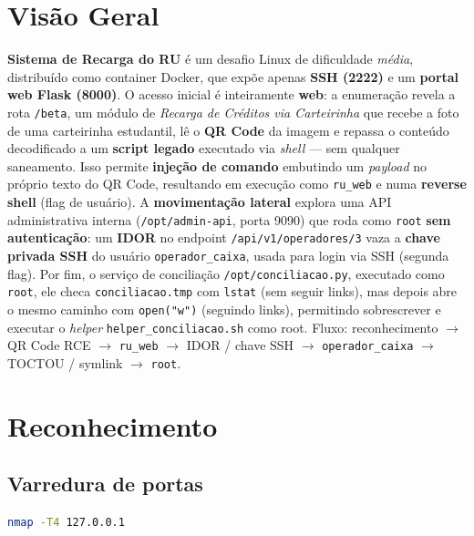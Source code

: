 \documentclass[12pt,a4paper]{article}
\begin{document}
\section{Visão Geral}
\textbf{Sistema de Recarga do RU} é um desafio Linux de dificuldade \emph{média},
distribuído como container Docker, que expõe apenas \textbf{SSH (2222)} e um
\textbf{portal web Flask (8000)}. O acesso inicial é inteiramente \textbf{web}: a
enumeração revela a rota \texttt{/beta}, um módulo de \emph{Recarga de Créditos via
Carteirinha} que recebe a foto de uma carteirinha estudantil, lê o \textbf{QR
Code} da imagem e repassa o conteúdo decodificado a um \textbf{script legado}
executado via \emph{shell} --- sem qualquer saneamento. Isso permite
\textbf{injeção de comando} embutindo um \emph{payload} no próprio
texto do QR Code, resultando em execução como \texttt{ru\_web} e numa
\textbf{reverse shell} (flag de usuário). A \textbf{movimentação lateral} explora
uma API administrativa interna (\texttt{/opt/admin-api}, porta 9090) que roda como
\texttt{root} \textbf{sem autenticação}: um \textbf{IDOR} no endpoint
\texttt{/api/v1/operadores/3} vaza a \textbf{chave privada SSH} do usuário
\texttt{operador\_caixa}, usada para login via SSH (segunda flag). Por fim, o
serviço de conciliação \texttt{/opt/conciliacao.py}, executado como \texttt{root}, ele
checa \texttt{conciliacao.tmp} com \texttt{lstat} (sem seguir links), mas depois
abre o mesmo caminho com \texttt{open("w")} (seguindo links), permitindo
sobrescrever e executar o \emph{helper} \texttt{helper\_conciliacao.sh} como root.
Fluxo: reconhecimento \texorpdfstring{$\rightarrow$}{->} QR Code RCE $\rightarrow$ \texttt{ru\_web}
\texorpdfstring{$\rightarrow$}{->} IDOR / chave SSH $\rightarrow$ \texttt{operador\_caixa}
\texorpdfstring{$\rightarrow$}{->} TOCTOU / symlink $\rightarrow$ \texttt{root}.

\section{Reconhecimento}

\subsection{Varredura de portas}
\begin{lstlisting}[language=bash,caption={Varredura inicial de portas com Nmap.}]
nmap -T4 127.0.0.1
\end{lstlisting}
\end{document}
